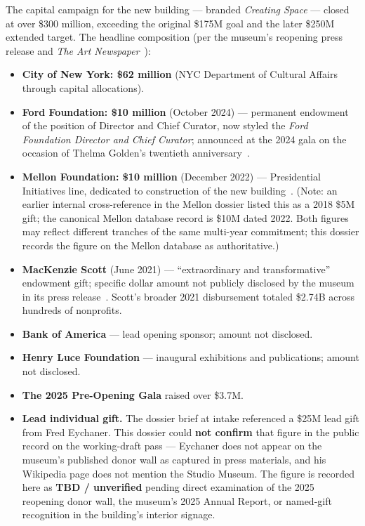 \documentclass[10pt,letterpaper,twocolumn]{article}
\begin{document}
The capital campaign for the new building --- branded \emph{Creating Space} --- closed at over \$300 million, exceeding the original \$175M goal and the later \$250M extended target. The headline composition (per the museum's reopening press release and \emph{The Art Newspaper}~\citep{tan2021studiomuseum,smh2025opening}):

\begin{itemize}
  \item \textbf{City of New York: \$62 million} (NYC Department of Cultural Affairs through capital allocations).
  \item \textbf{Ford Foundation: \$10 million} (October 2024) --- permanent endowment of the position of Director and Chief Curator, now styled the \emph{Ford Foundation Director and Chief Curator}; announced at the 2024 gala on the occasion of Thelma Golden's twentieth anniversary~\citep{smh2024ford}.
  \item \textbf{Mellon Foundation: \$10 million} (December 2022) --- Presidential Initiatives line, dedicated to construction of the new building~\citep{mellon2022capital}. (Note: an earlier internal cross-reference in the Mellon dossier listed this as a 2018 \$5M gift; the canonical Mellon database record is \$10M dated 2022. Both figures may reflect different tranches of the same multi-year commitment; this dossier records the figure on the Mellon database as authoritative.)
  \item \textbf{MacKenzie Scott} (June 2021) --- ``extraordinary and transformative'' endowment gift; specific dollar amount not publicly disclosed by the museum in its press release~\citep{smh2021scott}. Scott's broader 2021 disbursement totaled \$2.74B across hundreds of nonprofits.
  \item \textbf{Bank of America} --- lead opening sponsor; amount not disclosed.
  \item \textbf{Henry Luce Foundation} --- inaugural exhibitions and publications; amount not disclosed.
  \item \textbf{The 2025 Pre-Opening Gala} raised over \$3.7M.
  \item \textbf{Lead individual gift.} The dossier brief at intake referenced a \$25M lead gift from Fred Eychaner. This dossier could \textbf{not confirm} that figure in the public record on the working-draft pass --- Eychaner does not appear on the museum's published donor wall as captured in press materials, and his Wikipedia page does not mention the Studio Museum. The figure is recorded here as \textbf{TBD / unverified} pending direct examination of the 2025 reopening donor wall, the museum's 2025 Annual Report, or named-gift recognition in the building's interior signage.
\end{itemize}
\end{document}
